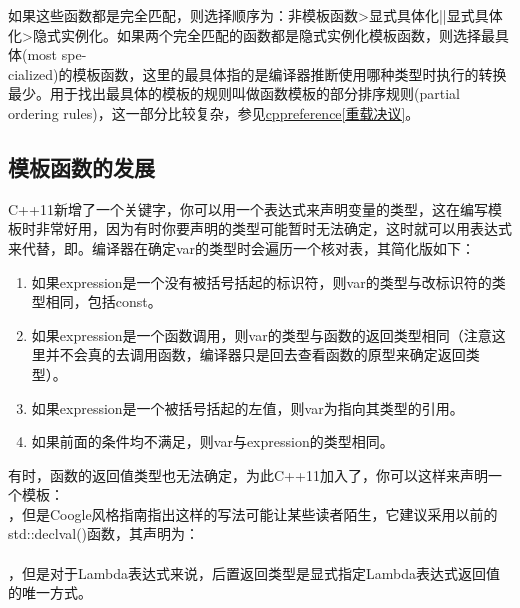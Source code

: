 如果这些函数都是完全匹配，则选择顺序为：非模板函数>显式具体化||显式具体化>隐式实例化。如果两个完全匹配的函数都是隐式实例化模板函数，则选择最具体(most spe-\\ cialized)的模板函数，这里的最具体指的是编译器推断使用哪种类型时执行的转换最少。用于找出最具体的模板的规则叫做函数模板的部分排序规则(partial ordering rules)，这一部分比较复杂，参见\thinspace\href{https://zh.cppreference.com/w/cpp/language/overload_resolution}{cppreference[重载决议]}\thinspace。

\subsection{模板函数的发展}

C++11新增了一个\thinspace\href{https://zh.cppreference.com/w/cpp/language/decltype}{}\thinspace 关键字，你可以用一个表达式来声明变量的类型，这在编写模板时非常好用，因为有时你要声明的类型可能暂时无法确定，这时就可以用表达式来代替，即。编译器在确定var的类型时会遍历一个核对表，其简化版如下：

\begin{enumerate}
\item 如果expression是一个没有被括号括起的标识符，则var的类型与改标识符的类型相同，包括const。
\item 如果expression是一个函数调用，则var的类型与函数的返回类型相同（注意这里并不会真的去调用函数，编译器只是回去查看函数的原型来确定返回类型）。
\item 如果expression是一个被括号括起的左值，则var为指向其类型的引用。
\item 如果前面的条件均不满足，则var与expression的类型相同。
\end{enumerate}

有时，函数的返回值类型也无法确定，为此C++11加入了，你可以这样来声明一个模板：\\ ，但是Coogle风格指南指出这样的写法可能让某些读者陌生，它建议采用以前的std::declval()函数，其声明为：\\ \\ ，但是对于Lambda表达式来说，后置返回类型是显式指定Lambda表达式返回值的唯一方式。
